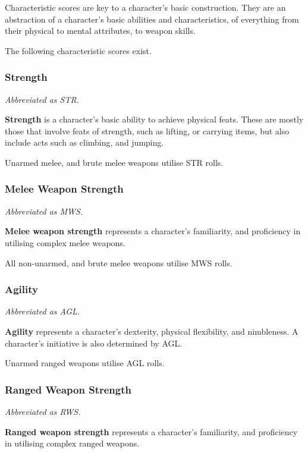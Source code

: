 \documentclass[]{article}
\begin{document}
Characteristic scores are key to a character's basic construction. They
are an abstraction of a character's basic abilities and characteristics,
of everything from their physical to mental attributes, to weapon
skills.

The following characteristic scores exist.

\subsubsection{Strength}\label{strength}

\emph{Abbreviated as STR.}

\textbf{Strength} is a character's basic ability to achieve physical
feats. These are mostly those that involve feats of strength, such as
lifting, or carrying items, but also include acts such as climbing, and
jumping.

Unarmed melee, and brute melee weapons utilise STR rolls.

\subsubsection{Melee Weapon Strength}\label{melee-weapon-strength}

\emph{Abbreviated as MWS.}

\textbf{Melee weapon strength} represents a character's familiarity, and
proficiency in utilising complex melee weapons.

All non-unarmed, and brute melee weapons utilise MWS rolls.

\subsubsection{Agility}\label{agility}

\emph{Abbreviated as AGL.}

\textbf{Agility} represents a character's dexterity, physical
flexibility, and nimbleness. A character's initiative is also determined
by AGL.

Unarmed ranged weapons utilise AGL rolls.

\subsubsection{Ranged Weapon Strength}\label{ranged-weapon-strength}

\emph{Abbreviated as RWS.}

\textbf{Ranged weapon strength} represents a character's familiarity,
and proficiency in utilising complex ranged weapons.
\end{document}
